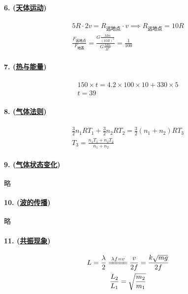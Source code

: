 \paragraph{6. (\hyperref[subsec:天体运动]{天体运动})}

\begin{gather*}
    5R\cdot2v=R_\textrm{远地点}\cdot v\implies R_\textrm{远地点}=10R\\
    \frac{F_\textrm{远地点}}{F_\textrm{地表}}=
    \frac{G\frac{Mm}{(10R)^2}}{G\frac{Mm}{R^2}}=\frac{1}{100}
\end{gather*}

\paragraph{7. (\hyperref[sec:热与能量]{热与能量})}

\begin{gather*}
    150\times t=4.2\times100\times10+330\times5\\
    t=39
\end{gather*}

\paragraph{8. (\hyperref[subsec:气体法则]{气体法则})}

\begin{gather*}
    \frac32n_1RT_1+\frac32n_2RT_2=\frac32(n_1+n_2)RT_3\\
    T_3=\frac{n_1T_1+n_2T_2}{n_1+n_2}
\end{gather*}

\paragraph{9. (\hyperref[subsec:气体状态变化]{气体状态变化})} 略
\paragraph{10. (\hyperref[subsec:波的传播]{波的传播})} 略
\paragraph{11. (\hyperref[subsec:共振现象]{共振现象})}

\begin{gather*}
    L=\frac{\lambda}{2}\xlongequal{\lambda f=v}\frac{v}{2f}=\frac{k\sqrt{mg}}{2f}\\
    \frac{L_2}{L_1}=\sqrt{\frac{m_2}{m_1}}
\end{gather*}

